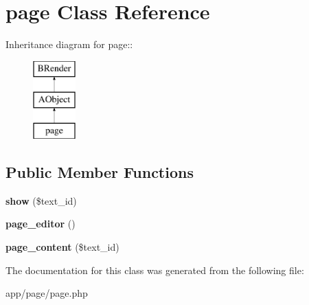 \section{page Class Reference}
\label{classpage}
Inheritance diagram for page::\begin{figure}[H]
\begin{center}
\leavevmode
\includegraphics[height=3cm]{classpage}
\end{center}
\end{figure}
\subsection*{Public Member Functions}
\begin{DoxyCompactItemize}
\item 
{\bfseries show} (\$text\_\-id)\label{classpage_aa96386f7747a22831b7f457a5de04492}

\item 
{\bfseries page\_\-editor} ()\label{classpage_a0a63fe507942528b7e28e347a8e412cf}

\item 
{\bfseries page\_\-content} (\$text\_\-id)\label{classpage_a2142843179bb1715b50f356b5935ead8}

\end{DoxyCompactItemize}


The documentation for this class was generated from the following file:\begin{DoxyCompactItemize}
\item 
app/page/page.php\end{DoxyCompactItemize}
